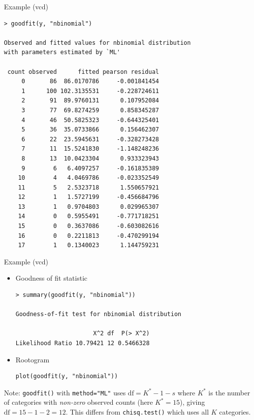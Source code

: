 \documentclass[10pt,ignorenonframetext,aspectratio=169]{beamer}
\begin{document}
\begin{frame}[fragile]{Example (vcd)}
\small
\begin{verbatim}
> goodfit(y, "nbinomial")

Observed and fitted values for nbinomial distribution
with parameters estimated by `ML' 

 count observed      fitted pearson residual
     0       86  86.0170786     -0.001841454
     1      100 102.3135531     -0.228724611
     2       91  89.9760131      0.107952084
     3       77  69.8274259      0.858345287
     4       46  50.5825323     -0.644325401
     5       36  35.0733866      0.156462307
     6       22  23.5945631     -0.328273428
     7       11  15.5241830     -1.148248236
     8       13  10.0423304      0.933323943
     9        6   6.4097257     -0.161835389
    10        4   4.0469786     -0.023352549
    11        5   2.5323718      1.550657921
    12        1   1.5727199     -0.456684796
    13        1   0.9704803      0.029965307
    14        0   0.5955491     -0.771718251
    15        0   0.3637086     -0.603082616
    16        0   0.2211813     -0.470299194
    17        1   0.1340023      1.144759231
\end{verbatim}
\end{frame}

\begin{frame}[fragile]{Example (vcd)}
    \begin{itemize}
        \item Goodness of fit statistic
\begin{verbatim}
> summary(goodfit(y, "nbinomial"))

Goodness-of-fit test for nbinomial distribution

                      X^2 df  P(> X^2)
Likelihood Ratio 10.79421 12 0.5466328
\end{verbatim}
        \item Rootogram
\begin{verbatim}
plot(goodfit(y, "nbinomial"))
\end{verbatim}
    \end{itemize}

\vspace{0.2cm}
\alert{Note:} \texttt{goodfit()} with \texttt{method="ML"} uses $\text{df} = K^{*} - 1 - s$ where $K^{*}$ is the number of categories with \textit{non-zero} observed counts (here $K^{*} = 15$), giving $\text{df} = 15 - 1 - 2 = 12$. This differs from \texttt{chisq.test()} which uses all $K$ categories.
\end{frame}
\end{document}
